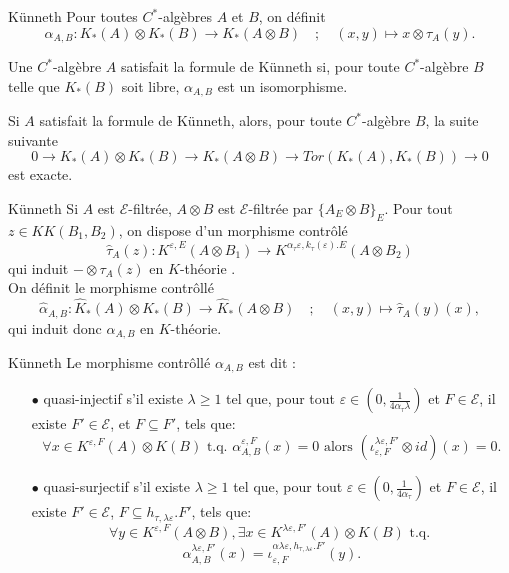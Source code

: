 \begin{frame}{Künneth}
Pour toutes $C^*$-algèbres $A$ et $B$, on définit
\[\alpha_{A,B} : K_*(A)\otimes K_*(B)\rightarrow K_*(A\otimes B) \quad ; \quad (x,y)\mapsto x\otimes   \tau_A(y).\]

\begin{definitionfr}
Une $C^*$-algèbre $A$ satisfait la formule de Künneth si, pour toute $C^*$-algèbre $B$ telle que $K_*(B)$ soit libre, $\alpha_{A,B}$ est un isomorphisme.
\end{definitionfr}

Si $A$ satisfait la formule de Künneth, alors, pour toute $C^*$-algèbre $B$, la suite suivante
\[0  \rightarrow K_*(A)\otimes K_*(B) \rightarrow K_*(A\otimes B)  \rightarrow Tor(K_*(A),K_*(B)) \rightarrow 0\]
est exacte.

\end{frame}

\begin{frame}{Künneth}
Si $A$ est $\mathcal E$-filtrée, $A\otimes B$ est $\mathcal E$-filtrée par $\{A_E\otimes B\}_E$. Pour tout $z \in KK(B_1,B_2)$, on dispose d'un morphisme contrôlé 
\[\hat \tau_A (z): K^{\varepsilon,E}(A\otimes B_1 ) \rightarrow K^{\alpha_\tau\varepsilon,k_\tau(\varepsilon).E}(A\otimes B_2)\]
qui induit $-\otimes \tau_A(z) $ en $K$-théorie \cite{OY2}.\\
\vspace{0.3 cm}
On définit le morphisme contrôllé  
\[\hat\alpha_{A,B} : \hat K_*(A)\otimes K_*(B)\rightarrow \hat K_*(A\otimes B) \quad ; \quad (x,y)\mapsto \hat\tau_A(y)(x),\]
qui induit donc $\alpha_{A,B}$ en $K$-théorie.\\
\end{frame}

\begin{frame}{Künneth}
Le morphisme contrôllé $\alpha_{A,B}$ est dit :
\begin{itemize}
 
\item[$\bullet$] quasi-injectif s'il existe $\lambda \geq 1$ tel que, pour tout $\varepsilon\in (0,\frac{1}{4\alpha_\tau \lambda})$ et $F\in\mathcal E$, il existe $F'\in\mathcal E$, et $F\subseteq F'$, tels que: 
\[\forall x\in K^{\varepsilon,F}(A)\otimes K(B)\text{ t.q. }\alpha_{A,B}^{\varepsilon,F}(x)=0 \text{ alors }(\iota_{\varepsilon,F}^{\lambda\varepsilon,F'}\otimes id) (x) = 0.\] 

\item[$\bullet$] quasi-surjectif s'il existe $\lambda \geq 1$ tel que, pour tout $\varepsilon \in (0,\frac{1}{4\alpha_\tau})$ et $F\in\mathcal E$, il existe $F'\in\mathcal E$, $F\subseteq h_{\tau,\lambda\varepsilon}.F'$, tels que:
\[ \forall y\in K^{\varepsilon,F}(A\otimes B), \exists x\in K^{\lambda\varepsilon, F'}(A)\otimes K(B) \text{ t.q. }\]
\[\alpha^{\lambda\varepsilon,F'}_{A,B}(x)=\iota_{\varepsilon,F}^{\alpha\lambda\varepsilon,h_{\tau, \lambda\varepsilon}.F'}(y).\] 

\end{itemize}
\end{frame}

